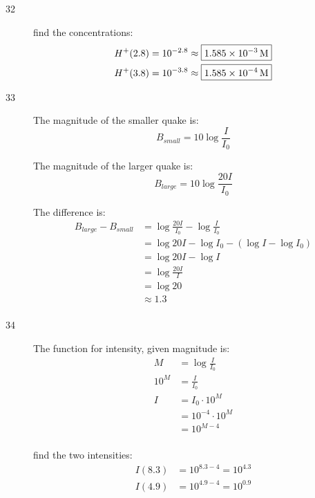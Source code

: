 \documentclass{exam}
\begin{document}
\begin{description}
      \item[32]
        find the concentrations:
        \begin{align*}
          H^+(2.8) &= 10^{-2.8} \approx \boxed{\unit[1.585 \times 10^{-3}]{M}} \\
          H^+(3.8) &= 10^{-3.8} \approx \boxed{\unit[1.585 \times 10^{-4}]{M}} \\
        \end{align*}

      \item[33]
        The magnitude of the smaller quake is:
        \[
          B_{small} = 10 \log \frac{I}{I_0}
        \]

        The magnitude of the larger quake is:
        \[
          B_{large} = 10 \log \frac{20 I}{I_0}
        \]

        The difference is:
        \begin{align*}
          B_{large} - B_{small} & = \log \frac{20 I}{I_0} - \log \frac{I}{I_0} \\
                                & = \log 20I - \log I_0 - ( \log I - \log I_0) \\
                                & = \log 20I - \log I \\
                                & = \log \frac{20I}{I} \\
                                & = \log 20 \\
                                & \approx \boxed{1.3} \\
        \end{align*}

      \pagebreak

      \item[34]
        The function for intensity, given magnitude is:
        \begin{align*}
          M    & = \log \frac{I}{I_0} \\
          10^M & = \frac{I}{I_0} \\
          I     & = I_0 \cdot 10^M \\
                & = 10^{-4} \cdot 10^M \\
                & = 10^{M - 4} \\
        \end{align*}

        find the two intensities:
        \begin{align*}
          I(8.3) &= 10^{8.3 - 4} = 10^{4.3} \\
          I(4.9) &= 10^{4.9 - 4} = 10^{0.9} \\
        \end{align*}


\end{description}
\end{document}
